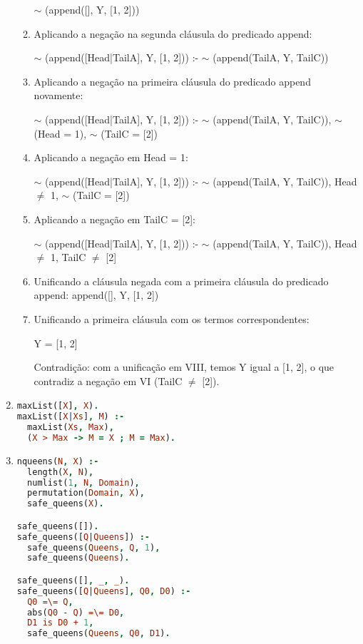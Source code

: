 \documentclass{article}
\begin{document}
\begin{enumerate}
\begin{enumerate}[I]
                        $\sim$ (append([], Y, [1, 2]))
                    \item Aplicando a negação na segunda cláusula do predicado append:

                        $\sim$ (append([Head|TailA], Y, [1, 2])) :- $\sim$ (append(TailA, Y, TailC))
                    \item 
                        Aplicando a negação na primeira cláusula do predicado append novamente:

                        $\sim$ (append([Head|TailA], Y, [1, 2])) :- $\sim$ (append(TailA, Y, TailC)), $\sim$ (Head = 1), $\sim$ (TailC = [2])
                    \item 
                        Aplicando a negação em Head = 1:

                        $\sim$ (append([Head|TailA], Y, [1, 2])) :- $\sim$ (append(TailA, Y, TailC)), Head $\neq$ 1, $\sim$ (TailC = [2])

                    \item 
                        Aplicando a negação em TailC = [2]:

                        $\sim$ (append([Head|TailA], Y, [1, 2])) :- $\sim$ (append(TailA, Y, TailC)), Head $\neq$ 1, TailC $\neq$ [2]

                    \item 
                        Unificando a cláusula negada com a primeira cláusula do predicado append:
                        append([], Y, [1, 2])

                    \item 
                        Unificando a primeira cláusula com os termos correspondentes:

                        Y = [1, 2]

                        Contradição: com a unificação em VIII, temos Y igual a [1, 2], o que contradiz a negação em VI (TailC $\neq$ [2]).

                \end{enumerate}

            \item 
\begin{lstlisting}[language=prolog]
maxList([X], X).
maxList([X|Xs], M) :-
  maxList(Xs, Max),
  (X > Max -> M = X ; M = Max).
\end{lstlisting}

            \item 
\begin{lstlisting}[language=prolog]
nqueens(N, X) :-
  length(X, N),
  numlist(1, N, Domain),
  permutation(Domain, X),
  safe_queens(X).

safe_queens([]).
safe_queens([Q|Queens]) :-
  safe_queens(Queens, Q, 1),
  safe_queens(Queens).

safe_queens([], _, _).
safe_queens([Q|Queens], Q0, D0) :-
  Q0 =\= Q,
  abs(Q0 - Q) =\= D0,
  D1 is D0 + 1,
  safe_queens(Queens, Q0, D1).
\end{lstlisting}
    \end{enumerate}
\end{document}
